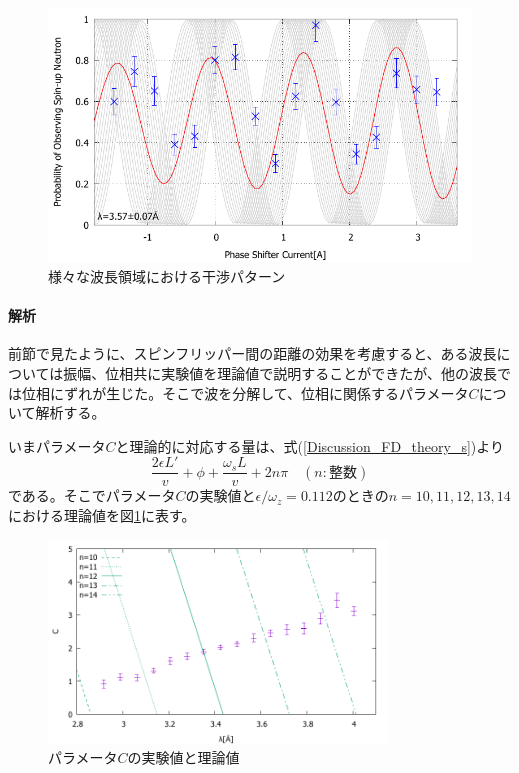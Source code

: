 \begin{figure}[H]
\begin{minipage}{0.5\hsize}
\end{minipage}
\begin{minipage}{0.5\hsize}
\includegraphics[width=\hsize]{discussion/FD/IT_s_500.pdf}
\end{minipage}
\caption{様々な波長領域における干渉パターン}
\end{figure}

\paragraph{解析}
前節で見たように、スピンフリッパー間の距離の効果を考慮すると、ある波長については振幅、位相共に実験値を理論値で説明することができたが、他の波長では位相にずれが生じた。そこで波を分解して、位相に関係するパラメータ$C$について解析する。

いまパラメータ$C$と理論的に対応する量は、式(\ref{Discussion_FD_theory_s})より
\begin{equation}
\frac{2\epsilon L'}{v} +\phi +\frac{\omega_s L}{v}+2n\pi \quad (n:整数)
\end{equation}
である。そこでパラメータ$C$の実験値と$\epsilon/\omega_z=0.112$のときの$n=10,11,12,13,14$における理論値を図\ref{Discussion_FD_fig_C_s_470_fit}に表す。
\begin{figure}[H]
\centering
\includegraphics[width=9cm]{discussion/FD/C_s_470_fit.pdf}
\caption{パラメータ$C$の実験値と理論値}\label{Discussion_FD_fig_C_s_470_fit}
\end{figure}

